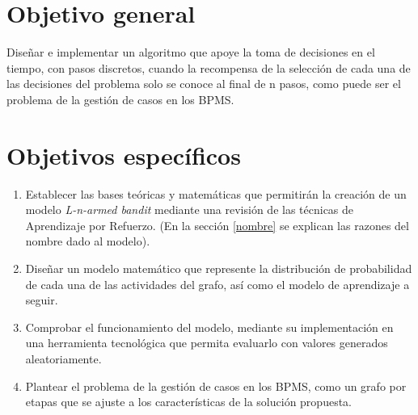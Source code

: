 


\section{Objetivo general}

Diseñar e implementar un algoritmo que apoye la toma de decisiones en el tiempo, con pasos discretos, cuando la recompensa de la selección de cada una de las decisiones del problema solo se conoce al final de n pasos, como puede ser el problema de la gestión de casos en los BPMS.

\section{Objetivos específicos}\label{objespe}

\renewcommand{\labelenumi}{\theenumi}
\renewcommand{\theenumi}{\ref{objespe}.\arabic{enumi}.}
\renewcommand{\theenumii}{\theenumi\arabic{enumii}}
\begin{enumerate}

\item Establecer las bases teóricas y matemáticas que permitirán la creación de un modelo \textit{L-n-armed bandit} mediante una revisión de las técnicas de Aprendizaje por Refuerzo. (En la sección \ref{nombre} se explican las razones del nombre dado al modelo).

\item Diseñar un modelo matemático que represente la distribución de probabilidad de cada una de las actividades del grafo, así como el modelo de aprendizaje a seguir.

\item Comprobar el funcionamiento del modelo, mediante su implementación en una herramienta tecnológica que permita evaluarlo con valores generados aleatoriamente.  

\item Plantear el problema de la gestión de casos en los BPMS, como un grafo por etapas que se ajuste a los características de la solución propuesta.
\end{enumerate}
 \renewcommand{\labelenumi}{\arabic{enumi}.}
\renewcommand{\labelenumii}{\theenumi.\arabic{enumii}.}

